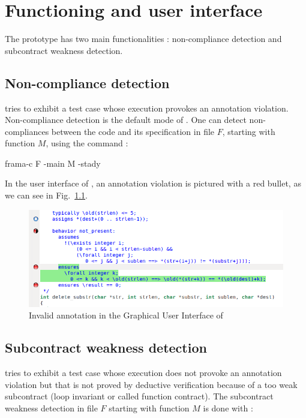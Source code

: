 \documentclass[web]{frama-c-book}
\begin{document}

\chapter{Functioning and user interface}

The \stady prototype has two main functionalities : non-compliance detection and subcontract weakness detection.

\section{Non-compliance detection}

\stady tries to exhibit a test case whose execution provokes an annotation violation. Non-compliance detection is the default mode of \stady. One can detect non-compliances between the code and its specification in file $F$, starting with function $M$, using the command :

\begin{shell}
frama-c F -main M -stady
\end{shell}

In the user interface of \framac, an annotation violation is pictured with a red bullet, as we can see in Fig.~\ref{fig:gui}.

\begin{figure}\centering
  \includegraphics[scale=.4]{ppt_invalid.png}
  \caption{Invalid annotation in the Graphical User Interface of \framac
    \label{fig:gui}}
\end{figure}

\section{Subcontract weakness detection}

\stady tries to exhibit a test case whose execution does not provoke an annotation violation but that is not proved by deductive verification because of a too weak subcontract (loop invariant or called function contract). The subcontract weakness detection in file $F$ starting with function $M$ is done with :
\end{document}
